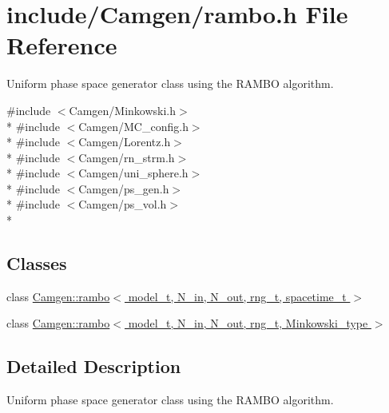 \hypertarget{a00728}{\section{include/\-Camgen/rambo.h File Reference}
\label{a00728}
}


Uniform phase space generator class using the R\-A\-M\-B\-O algorithm.  


{\ttfamily \#include $<$Camgen/\-Minkowski.\-h$>$}\\*
{\ttfamily \#include $<$Camgen/\-M\-C\-\_\-config.\-h$>$}\\*
{\ttfamily \#include $<$Camgen/\-Lorentz.\-h$>$}\\*
{\ttfamily \#include $<$Camgen/rn\-\_\-strm.\-h$>$}\\*
{\ttfamily \#include $<$Camgen/uni\-\_\-sphere.\-h$>$}\\*
{\ttfamily \#include $<$Camgen/ps\-\_\-gen.\-h$>$}\\*
{\ttfamily \#include $<$Camgen/ps\-\_\-vol.\-h$>$}\\*
\subsection*{Classes}
\begin{DoxyCompactItemize}
\item 
class \hyperlink{a00457}{Camgen\-::rambo$<$ model\-\_\-t, N\-\_\-in, N\-\_\-out, rng\-\_\-t, spacetime\-\_\-t $>$}
\item 
class \hyperlink{a00458}{Camgen\-::rambo$<$ model\-\_\-t, N\-\_\-in, N\-\_\-out, rng\-\_\-t, Minkowski\-\_\-type $>$}
\end{DoxyCompactItemize}


\subsection{Detailed Description}
Uniform phase space generator class using the R\-A\-M\-B\-O algorithm. 
